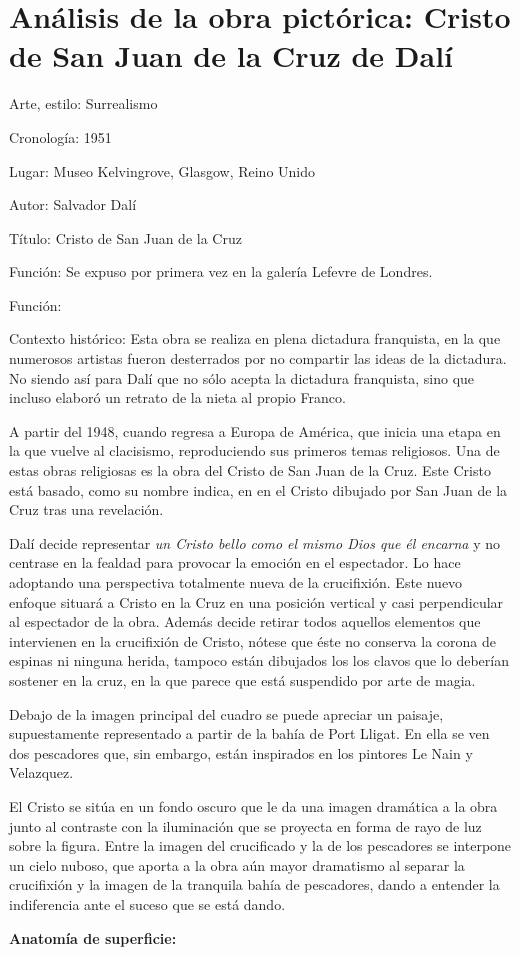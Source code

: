 \section{Análisis de la obra pictórica: Cristo de San Juan de la Cruz de Dalí}

Arte, estilo: Surrealismo

Cronología: 1951

Lugar: Museo Kelvingrove, Glasgow, Reino Unido

Autor: Salvador Dalí

Título: Cristo de San Juan de la Cruz

Función: Se expuso por primera vez en la galería Lefevre de Londres. %

Función:

Contexto histórico: Esta obra se realiza en plena dictadura franquista, en la que numerosos artistas fueron desterrados por no compartir las ideas de la dictadura. No siendo así para Dalí que no sólo acepta la dictadura franquista, sino que incluso elaboró un retrato de la nieta al propio Franco.

A partir del 1948, cuando regresa a Europa de América, que inicia una etapa en la que vuelve al clacisismo, reproduciendo sus primeros temas religiosos. Una de estas obras religiosas es la obra del Cristo de San Juan de la Cruz. Este Cristo está basado, como su nombre indica, en en el Cristo dibujado por San Juan de la Cruz tras una revelación.

Dalí decide representar \textit{un Cristo bello como el mismo Dios que él encarna} y no centrase en la fealdad para provocar la emoción en el espectador. Lo hace adoptando una perspectiva totalmente nueva de la crucifixión. Este nuevo enfoque situará a Cristo en la Cruz en una posición vertical y casi perpendicular al espectador de la obra. Además decide retirar todos aquellos elementos que intervienen en la crucifixión de Cristo, nótese que éste no conserva la corona de espinas ni ninguna herida, tampoco están dibujados los los clavos que lo deberían sostener en la cruz, en la que parece que está suspendido por arte de magia.

Debajo de la imagen principal del cuadro se puede apreciar un paisaje, supuestamente representado a partir de la bahía de Port Lligat. En ella se ven dos pescadores que, sin embargo, están inspirados en los pintores Le Nain y Velazquez.

El Cristo se sitúa en un fondo oscuro que le da una imagen dramática a la obra junto al contraste con la iluminación que se proyecta en forma de rayo de luz sobre la figura. Entre la imagen del crucificado y la de los pescadores se interpone un cielo nuboso, que aporta a la obra aún mayor dramatismo al separar la crucifixión y la imagen de la tranquila bahía de pescadores, dando a entender la indiferencia ante el suceso que se está dando.


\vspace{12pt}
\textbf{Anatomía de superficie:}
